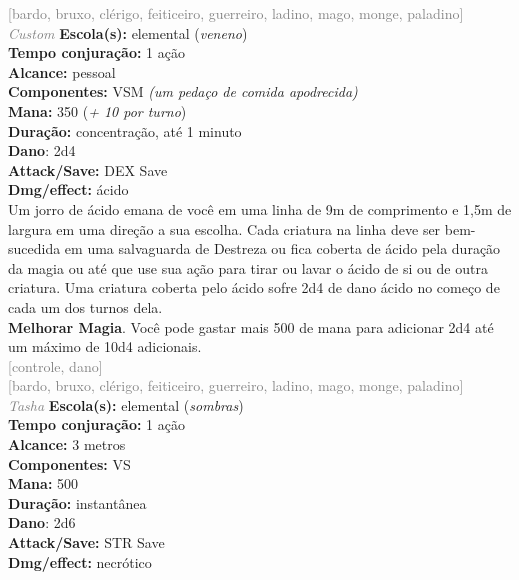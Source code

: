 \documentclass{RPG_Adventure}[2021/10/20]
\begin{document}
{\scriptsize \textcolor{gray}{[bardo, bruxo, clérigo, feiticeiro, guerreiro, ladino, mago, monge, paladino]\\}}
{\tiny \textcolor{gray}{\textit{Custom}}}
{\small \t \textbf{Escola(s):} elemental (\textit{veneno})\\\t \textbf{Tempo conjuração:} 1 ação\\\t \textbf{Alcance:} pessoal\\\t \textbf{Componentes:} VSM \textit{(um pedaço de comida apodrecida)}\\\t \textbf{Mana:} 350 (\textit{+ 10 por turno})\\\t \textbf{Duração:} concentração, até 1 minuto\\\t \textbf{Dano}: 2d4\\\t \textbf{Attack/Save:} DEX Save\\\t \textbf{Dmg/effect:} ácido\\}
{\normalsize Um jorro de ácido emana de você em uma linha de 9m de comprimento e 1,5m de largura em uma direção a sua escolha. Cada criatura na linha deve ser bem-sucedida em uma salvaguarda de Destreza ou fica coberta de ácido pela duração da magia ou até que use sua ação para tirar ou lavar o ácido de si ou de outra criatura. Uma criatura coberta pelo ácido sofre 2d4 de dano ácido no começo de cada um dos turnos dela.\\\t \textbf{Melhorar Magia}. Você pode gastar mais 500 de mana para adicionar 2d4 até um máximo de 10d4 adicionais.\\}
{\scriptsize \textcolor{gray}{[controle, dano]\\}}
{\scriptsize \textcolor{gray}{[bardo, bruxo, clérigo, feiticeiro, guerreiro, ladino, mago, monge, paladino]\\}}
{\tiny \textcolor{gray}{\textit{Tasha}}}
{\small \t \textbf{Escola(s):} elemental (\textit{sombras})\\\t \textbf{Tempo conjuração:} 1 ação\\\t \textbf{Alcance:} 3 metros\\\t \textbf{Componentes:} VS\\\t \textbf{Mana:} 500\\\t \textbf{Duração:} instantânea\\\t \textbf{Dano}: 2d6\\\t \textbf{Attack/Save:} STR Save\\\t \textbf{Dmg/effect:} necrótico\\}
\end{document}
